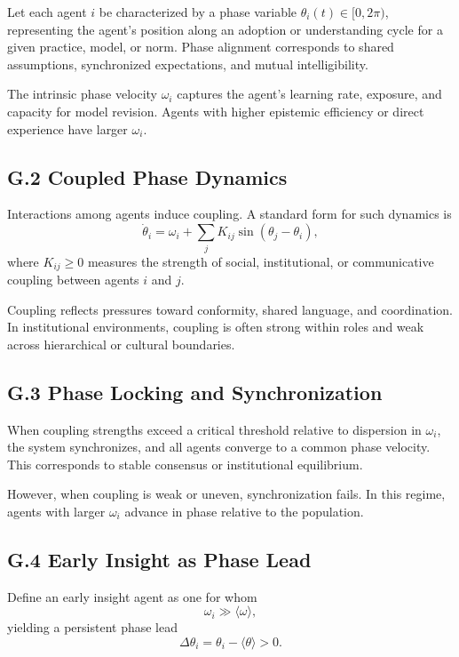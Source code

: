 \documentclass[11pt]{article}
\begin{document}
Let each agent \(i\) be characterized by a phase variable \(\theta_i(t) \in [0, 2\pi)\), representing the agent’s position along an adoption or understanding cycle for a given practice, model, or norm. Phase alignment corresponds to shared assumptions, synchronized expectations, and mutual intelligibility.

The intrinsic phase velocity \(\omega_i\) captures the agent’s learning rate, exposure, and capacity for model revision. Agents with higher epistemic efficiency or direct experience have larger \(\omega_i\).

\subsection{G.2 Coupled Phase Dynamics}

Interactions among agents induce coupling. A standard form for such dynamics is
\[
\dot{\theta}_i = \omega_i + \sum_{j} K_{ij} \sin(\theta_j - \theta_i),
\]
where \(K_{ij} \ge 0\) measures the strength of social, institutional, or communicative coupling between agents \(i\) and \(j\).

Coupling reflects pressures toward conformity, shared language, and coordination. In institutional environments, coupling is often strong within roles and weak across hierarchical or cultural boundaries.

\subsection{G.3 Phase Locking and Synchronization}

When coupling strengths exceed a critical threshold relative to dispersion in \(\omega_i\), the system synchronizes, and all agents converge to a common phase velocity. This corresponds to stable consensus or institutional equilibrium.

However, when coupling is weak or uneven, synchronization fails. In this regime, agents with larger \(\omega_i\) advance in phase relative to the population.

\subsection{G.4 Early Insight as Phase Lead}

Define an early insight agent as one for whom
\[
\omega_i \gg \langle \omega \rangle,
\]
yielding a persistent phase lead
\[
\Delta \theta_i = \theta_i - \langle \theta \rangle > 0.
\]
\end{document}
